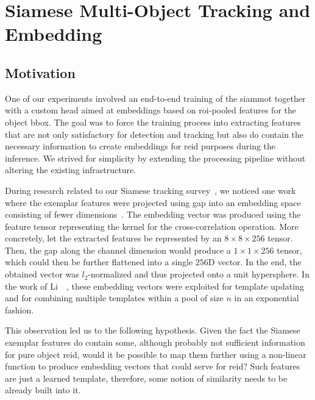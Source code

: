 \section{Siamese Multi-Object Tracking and Embedding}
\label{sec:SiamMOTandFeatureEmb}

\subsection{Motivation}

One of our experiments involved an end-to-end training of the \gls{siammot} together with a custom head aimed at embeddings based on \gls{roi}-pooled features for the object \gls{bbox}. The goal was to force the training process into extracting features that are not only satisfactory for detection and tracking but also do contain the necessary information to create embeddings for \gls{reid} purposes during the inference. We strived for simplicity by extending the processing pipeline without altering the existing infrastructure.

During research related to our Siamese tracking survey~\cite{ondrasovic2021siamese}, we noticed one work where the exemplar features were projected using \gls{gap} into an embedding space consisting of fewer dimensions~\cite{li2020figsiam}. The embedding vector was produced using the feature tensor representing the kernel for the cross-correlation operation. More concretely, let the extracted features be represented by an $8 \times 8 \times 256$ tensor. Then, the \gls{gap} along the channel dimension would produce a $1 \times 1 \times 256$ tensor, which could then be further flattened into a single $256$D vector. In the end, the obtained vector was $l_2$-normalized and thus projected onto a unit hypersphere. In the work of Li~\etal{}~\cite{li2020figsiam}, these embedding vectors were exploited for template updating and for combining multiple templates within a pool of size $n$ in an exponential fashion.

This observation led us to the following hypothesis. Given the fact the Siamese exemplar features do contain some, although probably not sufficient information for pure object \gls{reid}, would it be possible to map them further using a non-linear function to produce embedding vectors that could serve for \gls{reid}? Such features are just a learned template, therefore, some notion of similarity needs to be already built into it.

